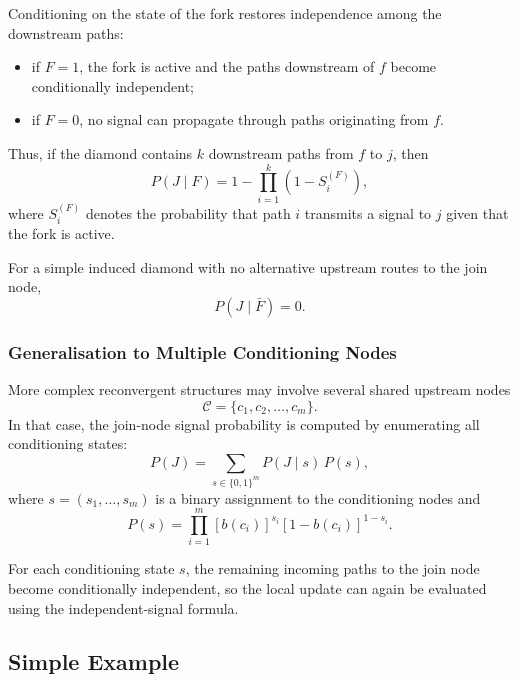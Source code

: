 \documentclass[preprint,12pt]{elsarticle}
\begin{document}
Conditioning on the state of the fork restores independence among the downstream paths:
\begin{itemize}
    \item if $F=1$, the fork is active and the paths downstream of $f$ become conditionally independent;
    \item if $F=0$, no signal can propagate through paths originating from $f$.
\end{itemize}

Thus, if the diamond contains $k$ downstream paths from $f$ to $j$, then
\begin{equation}
P(J \mid F) = 1-\prod_{i=1}^{k}\left(1-S_i^{(F)}\right),
\label{eq:diamond_conditional_update}
\end{equation}
where $S_i^{(F)}$ denotes the probability that path $i$ transmits a signal to $j$ given that the fork is active.

For a simple induced diamond with no alternative upstream routes to the join node,
\begin{equation}
P(J \mid \bar{F}) = 0.
\label{eq:diamond_no_alternative}
\end{equation}

\subsubsection{Generalisation to Multiple Conditioning Nodes}

More complex reconvergent structures may involve several shared upstream nodes
\[
\mathcal{C} = \{c_1,c_2,\ldots,c_m\}.
\]
In that case, the join-node signal probability is computed by enumerating all conditioning states:
\begin{equation}
P(J) = \sum_{s \in \{0,1\}^{m}} P(J \mid s)\,P(s),
\label{eq:multi_conditioning}
\end{equation}
where $s=(s_1,\ldots,s_m)$ is a binary assignment to the conditioning nodes and
\begin{equation}
P(s)=\prod_{i=1}^{m}[b(c_i)]^{s_i}[1-b(c_i)]^{1-s_i}.
\label{eq:state_probability}
\end{equation}

For each conditioning state $s$, the remaining incoming paths to the join node become conditionally independent, so the local update can again be evaluated using the independent-signal formula.

\subsection{Simple Example}
\end{document}
